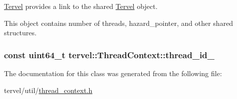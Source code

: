 \hyperlink{classtervel_1_1_tervel}{Tervel} provides a link to the shared \hyperlink{classtervel_1_1_tervel}{Tervel} object. 

This object contains number of threads, hazard\+\_\+pointer, and other shared structures. \hypertarget{classtervel_1_1_thread_context_aba7d0450873f2cb6afd9125d6d233983}{}
\subsubsection[{thread\+\_\+id\+\_\+}]{\setlength{\rightskip}{0pt plus 5cm}const uint64\+\_\+t tervel\+::\+Thread\+Context\+::thread\+\_\+id\+\_\+\hspace{0.3cm}{\ttfamily [private]}}\label{classtervel_1_1_thread_context_aba7d0450873f2cb6afd9125d6d233983}


The documentation for this class was generated from the following file\+:\begin{DoxyCompactItemize}
\item 
tervel/util/\hyperlink{thread__context_8h}{thread\+\_\+context.\+h}\end{DoxyCompactItemize}
